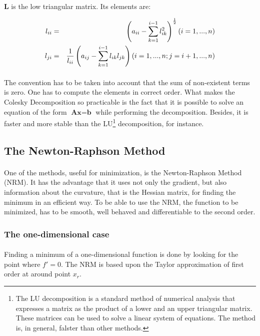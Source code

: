 \documentclass[a4paper,10pt]{thesis}
\begin{document}
\paragraph*{}
\textbf{L} is the low triangular matrix. Its elements are:

\begin{eqnarray}
l_{ii}&=&\left( a_{ii}-\sum^{i-1}_{k=1} l^2_{ik} \right) ^\frac{1}{2}\bigskip (i=1,...,n)\\
l_{ji}&=&\frac{1}{l_{ii}}\left( a_{ij}-\sum^{i-1}_{k=1} l_{ik} l_{jk}\right) \bigskip (i=1,...,n;j=i+1,...,n)
\end{eqnarray}

\paragraph*{}
The convention has to be taken into account that the sum of non-existent terms is zero. One has to compute the elements in correct order. What makes the Colesky Decomposition so practicable is the fact that it is possible to solve an equation of the form $\textbf{Ax}=\textbf{b}$ while performing the decomposition. Besides, it is faster and more stable than the LU\footnote{The LU decomposition is a standard method of numerical analysis that expresses a matrix as the product of a lower and an upper triangular matrix. These matrices can be used to solve a linear system of equations. The method is, in general, falster than other methods.} decomposition, for instance.
%
\subsection{The Newton-Raphson Method}
\paragraph*{}
One of the methods, useful for minimization, is the Newton-Raphson Method (NRM). It has the advantage that it uses not only the gradient, but also information about the curvature, that is the Hessian matrix, for finding the minimum in an efficient way. To be able to use the NRM, the function to be minimized, has to be smooth, well behaved and differentiable to the second order.

\subsubsection{The one-dimensional case}
\paragraph*{}
Finding a minimum of a one-dimensional function is done by looking for the point where $f'=0$. The NRM is based upon the Taylor approximation of first order at around point $x_r$.
\end{document}
